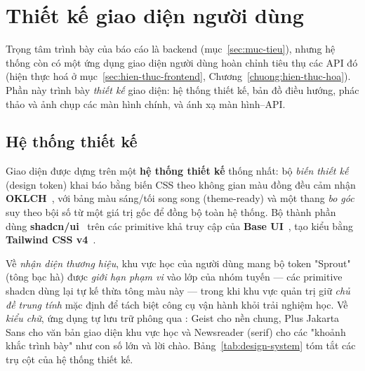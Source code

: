 \section{Thiết kế giao diện người dùng}
\label{sec:thiet-ke-giao-dien}

Trọng tâm trình bày của báo cáo là backend (mục~\ref{sec:muc-tieu}), nhưng
hệ thống còn có một ứng dụng giao diện người dùng hoàn chỉnh tiêu thụ các API
đó (hiện thực hoá ở mục~\ref{sec:hien-thuc-frontend},
Chương~\ref{chuong:hien-thuc-hoa}). Phần này trình bày \textit{thiết kế} giao
diện: hệ thống thiết kế, bản đồ điều hướng, phác thảo và ảnh chụp các màn
hình chính, và ánh xạ màn hình--API.

\subsection{Hệ thống thiết kế}
\label{subsec:design-system}

Giao diện được dựng trên một \textbf{hệ thống thiết kế} thống nhất: bộ
\textit{biến thiết kế} (design token) khai báo bằng biến CSS theo không gian
màu đồng đều cảm nhận \textbf{OKLCH}~\cite{w3ccsscolor4}, với bảng màu sáng/tối
song song (theme-ready) và một thang \textit{bo góc} suy theo bội số từ một
giá trị gốc để đồng bộ toàn hệ thống. Bộ thành phần dùng
\textbf{shadcn/ui}~\cite{shadcnui2024} trên các primitive khả truy cập của
\textbf{Base UI}~\cite{baseui2024}, tạo kiểu bằng \textbf{Tailwind CSS
v4}~\cite{tailwind2024}.

Về \textit{nhận diện thương hiệu}, khu vực học của người dùng mang bộ token
"Sprout" (tông bạc hà) được \textit{giới hạn phạm vi} vào lớp 
của nhóm tuyến  --- các primitive shadcn dùng lại tự kế thừa tông
màu này --- trong khi khu vực quản trị giữ \textit{chủ đề trung tính} mặc định
để tách biệt công cụ vận hành khỏi trải nghiệm học. Về \textit{kiểu chữ}, ứng
dụng tự lưu trữ phông qua : Geist cho nền chung, Plus Jakarta
Sans cho văn bản giao diện khu vực học và Newsreader (serif) cho các "khoảnh
khắc trình bày" như con số lớn và lời chào. Bảng~\ref{tab:design-system} tóm tắt
các trụ cột của hệ thống thiết kế.

